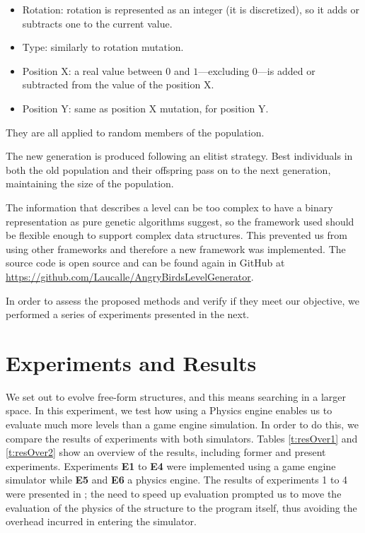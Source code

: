 \documentclass[a4paper,twoside]{article}
\begin{document}
\begin{itemize}
	\item Rotation: rotation is represented as an integer (it is discretized), 
	so it adds or 
	subtracts one 
	to the current value. %
	\item Type: similarly to rotation mutation.
	\item Position X: a real value between $0$ and $1$---excluding $0$---is 
	added or subtracted from the value of the position X.
	\item Position Y: same as position X mutation, for position Y.
\end{itemize}

They are all applied to random members of the population.

The new generation is produced following an elitist strategy. Best individuals in 
both the old population and their offspring pass on to the next generation, 
maintaining the size of the population.

The information that describes a level can be too complex to have a binary 
representation as pure genetic algorithms suggest, so the framework used should be 
flexible enough to support complex data structures. This prevented us from using other 
frameworks and therefore a new framework was implemented. The source
code is open source and can be found again in GitHub at
\url{https://github.com/Laucalle/AngryBirdsLevelGenerator}.

In order to assess the proposed methods and verify if they meet our
objective, we performed a series of experiments presented in the next.

\section{Experiments and Results}\label{ch:res}

We set out to evolve free-form structures, and this means searching in
a larger space. In this experiment, we test how using a Physics engine
enables us to evaluate much more levels than a game engine
simulation. In order to do this, we compare the results of experiments
with both simulators. Tables \ref{t:resOver1} and \ref{t:resOver2} 
show an overview of the results, including former and present
experiments. Experiments \textbf{E1} to \textbf{E4} were implemented 
using a game engine simulator while \textbf{E5} and \textbf{E6} a
physics engine. The results of experiments 1 to 4 were presented in
\cite{DBLP:conf/evoW/CalleGGV19anon}; the need to speed up evaluation
prompted us to move the evaluation of the physics of the structure to
the program itself, thus avoiding the overhead incurred in entering
the simulator.
\end{document}

